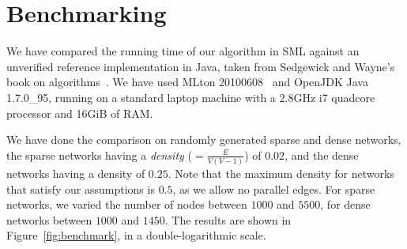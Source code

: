 \documentclass[smallcondensed]{svjour3}     %
\newcommand{\isai}{\lstinline[language=isabelle,basicstyle=\normalsize\ttfamily\slshape]}
\begin{document}
\begin{comment}
We use the previous results to complete the proof of the first step. It is easy
to see that \isai{init-preflow} and \isa{init-labeling} produce a valid preflow
as well as a valid height-labeling function. We have also shown the maintanance
of these properties earlier. When the algorithm terminates, the excess value
$e(v)$ of each vertex $v \in V$ is equal to $0$. So, the preflow that was
maintained during the execution becomes a valid flow. Given the fact that the
height-labeling assumptions are also maintained and using the latest auxillary
lemma, we can conclude that there is no path from source to sink in the residual
graph. Hence, the result of the algorithm is a maximum flow using the
Ford-fulkerson theorem.

\texttt{\\\\---Discuss termination proofs if required}

\texttt{\\\\---Discuss our time complexity proof, if required}

\texttt{\\\\---talk about relabel-to-front and fifo instances}

\end{comment}
  
\section{Benchmarking}\label{sec:benchmark}
  We have compared the running time of our algorithm in SML against an unverified reference implementation in Java, taken from Sedgewick and Wayne's book on algorithms~\cite{SeWa11}. We have used MLton 20100608~\cite{MLton} and OpenJDK Java 1.7.0\_95, running on a standard laptop machine with a 2.8GHz i7 quadcore processor and 16GiB of RAM.
  
  We have done the comparison on randomly generated sparse and dense networks, the sparse networks having a \emph{density} (${} = \frac{E}{V(V - 1)}$) of $0.02$, and the dense networks having a density of $0.25$. Note that the maximum density for networks that satisfy our assumptions is $0.5$, as we allow no parallel edges.
  For sparse networks, we varied the number of nodes between $1000$ and $5500$, for dense networks between $1000$ and $1450$.
  The results are shown in Figure~\ref{fig:benchmark}, in a double-logarithmic scale.
\end{document}
